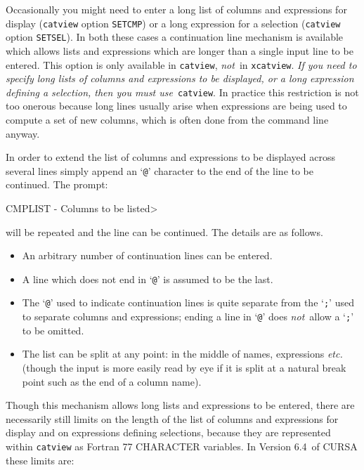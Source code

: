 \documentclass[twoside,11pt]{starlink}
\providecommand{\CURSAversion}{6.4~}
\begin{document}
Occasionally you might need to enter a long list of columns and
expressions for display (\texttt{catview} option \texttt{SETCMP}) or a long
expression for a selection (\texttt{catview} option \texttt{SETSEL}).  In both
these cases a continuation line mechanism is available which allows lists
and expressions which are longer than a single input line to be entered.
This option is only available in \texttt{catview}, \textit{not}\, in \texttt{xcatview}.  \textit{If you need to specify long lists of columns and
expressions to be displayed, or a long expression defining a selection,
then you must use}\, \texttt{catview}.  In practice this restriction is not
too onerous because long lines usually arise when expressions are being
used to compute a set of new columns, which is often done from the command
line anyway.

In order to extend the list of columns and expressions to be displayed
across several lines simply append an `\texttt{@}' character to the end of
the line to be continued. The prompt:

\begin{terminalv}
CMPLIST - Columns to be listed>
\end{terminalv}

will be repeated and the line can be continued.  The details are as
follows.

\begin{itemize}

  \item An arbitrary number of continuation lines can be entered.

  \item A line which does not end in `\texttt{@}' is assumed to be the last.

  \item The `\texttt{@}' used to indicate continuation lines is quite separate
   from the `\texttt{;}' used to separate columns and expressions; ending a
   line in `\texttt{@}' does \textit{not}\, allow a `\texttt{;}' to be omitted.

  \item The list can be split at any point: in the middle of names,
   expressions \emph{etc.} (though the input is more easily read by eye if
   it is split at a natural break point such as the end of a column name).

\end{itemize}

Though this mechanism allows long lists and expressions to be entered,
there are necessarily still limits on the length of the list of columns and
expressions for display and on expressions defining selections, because
they are represented within \texttt{catview} as Fortran 77 CHARACTER variables.
In Version \CURSAversion of CURSA these limits are:
\end{document}
